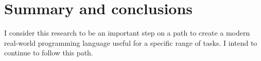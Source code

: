 \chapter{Summary and conclusions}\label{chap:summary}
I consider this research to be an important step on a path to create a modern real-world programming language useful for a specific range of tasks. I intend to continue to follow this path.
